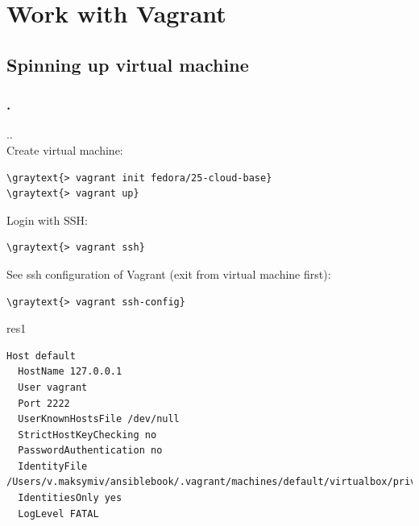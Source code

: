 \documentclass[pdf, 8pt, unicode, t]{beamer} %
\newcommand{\graytext}[1]{{\usebeamercolor[fg]{graytext_color}#1}}
\newcommand{\myinsertsubsection}{\alert{\Large\insertsectionnumber.\insertsubsectionnumber. \insertsubsection}\\}
\newcommand{\frametitlesection}{\frametitle{\thesection. \secname}}
\begin{document}
\section{Work with Vagrant}
\subsection{Spinning up virtual machine}
\begin{frame}[fragile]
\frametitlesection
\myinsertsubsection
\vspace{1em}
Create virtual machine:
\begin{Verbatim}[commandchars=\\\{\}]
\graytext{> vagrant init fedora/25-cloud-base}
\graytext{> vagrant up}
\end{Verbatim}

\vspace{1em}
Login with SSH:
\begin{Verbatim}[commandchars=\\\{\}]
\graytext{> vagrant ssh}
\end{Verbatim}

\vspace{1em}
See ssh configuration of Vagrant (exit from virtual machine first):
\begin{Verbatim}[commandchars=\\\{\}]
\graytext{> vagrant ssh-config}
\end{Verbatim}

\begin{beamercolorbox}[sep=-0.5em,rounded=true,shadow=true,center]{res1}
\small
\begin{Verbatim}[commandchars=\\\{\}]
Host default
  HostName 127.0.0.1
  User vagrant
  Port 2222
  UserKnownHostsFile /dev/null
  StrictHostKeyChecking no
  PasswordAuthentication no
  IdentityFile /Users/v.maksymiv/ansiblebook/.vagrant/machines/default/virtualbox/private\_key
  IdentitiesOnly yes
  LogLevel FATAL
\end{Verbatim}
\end{beamercolorbox}
\end{frame}
\end{document}

